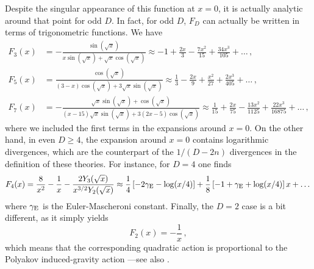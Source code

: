 \documentclass[11pt]{article}
\begin{document}
{Despite the singular appearance of this function at $x=0$, it is actually analytic around that point for odd $D$. In fact, for odd $D$, $F_{D}$ can actually be written in terms of trigonometric functions. We have
\begin{align}
F_{3}(x)&=-\frac{\sin \left(\sqrt{x}\right)}{x \sin \left(\sqrt{x}\right)+\sqrt{x} \cos \left(\sqrt{x}\right)}\approx -1 +\frac{2x}{3}-\frac{7x^2}{15}+\frac{34x^3}{105}+\dots \, ,\\
F_{5}(x)&=\frac{\cos \left(\sqrt{x}\right)}{(3-x) \cos \left(\sqrt{x}\right)+3 \sqrt{x} \sin \left(\sqrt{x}\right)}\approx \frac{1}{3}-\frac{2x}{9}+\frac{x^2}{27}+\frac{2x^3}{405}+\dots\, ,\\
F_{7}(x)&=-\frac{\sqrt{x} \sin \left(\sqrt{x}\right)+\cos \left(\sqrt{x}\right)}{(x-15) \sqrt{x} \sin \left(\sqrt{x}\right)+3 (2 x-5) \cos \left(\sqrt{x}\right)} \approx \frac{1}{15}+\frac{2x}{75}-\frac{13x^2}{1125}+\frac{22x^3}{16875}+\dots\, ,
\end{align}
where we included the first terms in the expansions around $x=0$.
On the other hand, in even $D\geq 4$, the expansion around $x=0$ contains logarithmic divergences, which are the counterpart of the $1/(D-2n)$ divergences in the definition of these theories. For instance, for $D=4$ one finds
\begin{equation}
F_4(x)=\frac{8}{x^2}-\frac{1}{x}-\frac{2 Y_{3}(\sqrt{x})}{x^{3/2} Y_2(\sqrt{x})}\approx \frac{1}{4}\left[-2\gamma_{\rm E}-\log(x/4) \right]+\frac{1}{8}\left[ -1+\gamma_{\rm E}+\log(x/4)\right]x + \dots
\end{equation}
where $\gamma_{\rm E}$ is the Euler-Mascheroni constant. Finally, the $D=2$ case is a bit different, as it simply yields 
\begin{equation}
F_2(x)=-\frac{1}{x}\, ,
\end{equation}
which means that the corresponding quadratic action is proportional to the Polyakov induced-gravity action \cite{Polyakov:1987zb} ---see also \cite{Chen:2020uac}.

}
\end{document}
